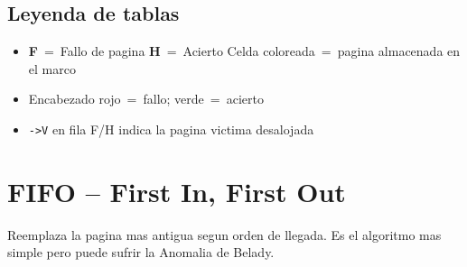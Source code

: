 \documentclass[12pt,a4paper]{article}
\begin{document}
\subsection*{Leyenda de tablas}
\begin{itemize}
  \item \textcolor{faultcol}{\textbf{F}}~=~Fallo de pagina\quad
        \textcolor{hitcol}{\textbf{H}}~=~Acierto\quad
        Celda coloreada~=~pagina almacenada en el marco
  \item Encabezado \colorbox{faultcol!50}{rojo}~=~fallo;
        \colorbox{hitcol!40}{verde}~=~acierto
  \item \texttt{->V} en fila F/H indica la pagina victima desalojada
\end{itemize}


\newpage
\section{FIFO -- First In, First Out}

Reemplaza la pagina mas antigua segun orden de llegada. Es el algoritmo mas simple pero puede sufrir la Anomalia de Belady.
\end{document}
